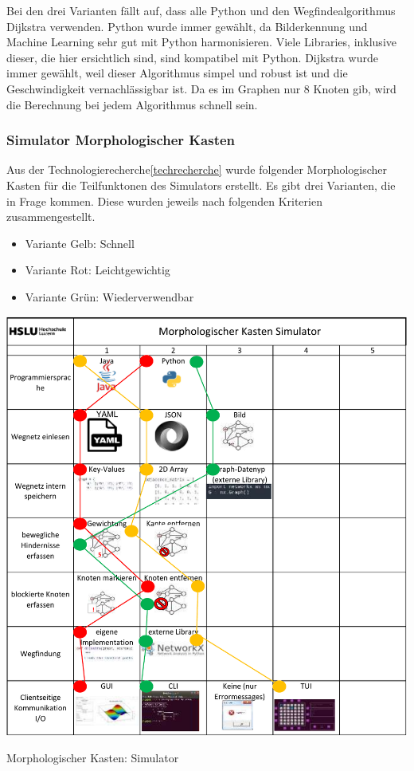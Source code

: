 Bei den drei Varianten fällt auf, dass alle Python und den Wegfindealgorithmus Dijkstra verwenden. Python wurde immer gewählt, da Bilderkennung und Machine Learning sehr gut mit Python harmonisieren. Viele Libraries, inklusive dieser, die hier ersichtlich sind, sind kompatibel mit Python. Dijkstra wurde immer gewählt, weil dieser Algorithmus simpel und robust ist und die Geschwindigkeit vernachlässigbar ist. Da es im Graphen nur 8 Knoten gib, wird die Berechnung bei jedem Algorithmus schnell sein.

\subsubsection{Simulator Morphologischer Kasten}\label{mk-simulator}


Aus der Technologierecherche\ref{techrecherche} wurde folgender Morphologischer Kasten für die Teilfunktonen des Simulators erstellt. Es gibt drei Varianten, die in Frage kommen. Diese wurden jeweils nach folgenden Kriterien zusammengestellt.

\begin{itemize}
    \item Variante Gelb: Schnell
    \item Variante Rot: Leichtgewichtig
    \item Variante Grün: Wiederverwendbar
\end{itemize}


\begin{table}[H]
\centering
\includegraphics[width=\textwidth]{assets/MK_Simulator.pdf}
\caption{Morphologischer Kasten: Simulator}
\label{table:mk-simulator}
\end{table}



